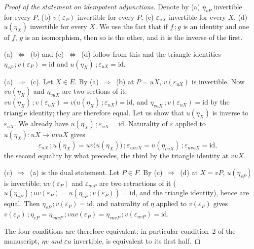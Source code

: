 \documentclass[11pt]{article}
\theoremstyle{plain}
\theoremstyle{definition}
\theoremstyle{remark}
\begin{document}
\begin{proof}[Proof of the statement on idempotent adjunctions]
Denote by (a) $\eta_{vP}$ invertible for every $P$, (b) $v(\varepsilon_P)$ invertible for every $P$, (c) $\varepsilon_{uX}$ invertible for every $X$, (d) $u(\eta_X)$ invertible for every $X$. We use the fact that if $f\,;g$ is an identity and one of $f$, $g$ is an isomorphism, then so is the other, and it is the inverse of the first.

(a)~$\Leftrightarrow$~(b) and (c)~$\Leftrightarrow$~(d) follow from this and the triangle identities $\eta_{vP}\,;v(\varepsilon_P) = \mathrm{id}$ and $u(\eta_X)\,;\varepsilon_{uX} = \mathrm{id}$.

(a)~$\Rightarrow$~(c). Let $X \in E$. By (a)~$\Rightarrow$~(b) at $P = uX$, $v(\varepsilon_{uX})$ is invertible. Now $vu(\eta_X)$ and $\eta_{vuX}$ are two sections of it: $vu(\eta_X)\,;v(\varepsilon_{uX}) = v\bigl(u(\eta_X)\,;\varepsilon_{uX}\bigr) = \mathrm{id}$, and $\eta_{vuX}\,;v(\varepsilon_{uX}) = \mathrm{id}$ by the triangle identity; they are therefore equal. Let us show that $u(\eta_X)$ is inverse to $\varepsilon_{uX}$. We already have $u(\eta_X)\,;\varepsilon_{uX} = \mathrm{id}$. Naturality of $\varepsilon$ applied to $u(\eta_X) : uX \to uvuX$ gives
\[
  \varepsilon_{uX}\,;u(\eta_X) = uv\bigl(u(\eta_X)\bigr)\,;\varepsilon_{uvuX} = u(\eta_{vuX})\,;\varepsilon_{uvuX} = \mathrm{id},
\]
the second equality by what precedes, the third by the triangle identity at $vuX$.

(c)~$\Rightarrow$~(a) is the dual statement. Let $P \in F$. By (c)~$\Rightarrow$~(d) at $X = vP$, $u(\eta_{vP})$ is invertible; $uv(\varepsilon_P)$ and $\varepsilon_{uvP}$ are two retractions of it ($u(\eta_{vP})\,;uv(\varepsilon_P) = u(\eta_{vP}\,;v(\varepsilon_P)) = \mathrm{id}$, and the triangle identity), hence are equal. Then $\eta_{vP}\,;v(\varepsilon_P) = \mathrm{id}$, and naturality of $\eta$ applied to $v(\varepsilon_P)$ gives $v(\varepsilon_P)\,;\eta_{vP} = \eta_{vuvP}\,;vuv(\varepsilon_P) = \eta_{vuvP}\,;v(\varepsilon_{uvP}) = \mathrm{id}$.

The four conditions are therefore equivalent; in particular condition~2 of the manuscript, $\eta v$ \emph{and} $\varepsilon u$ invertible, is equivalent to its first half.
\end{proof}
\end{document}
